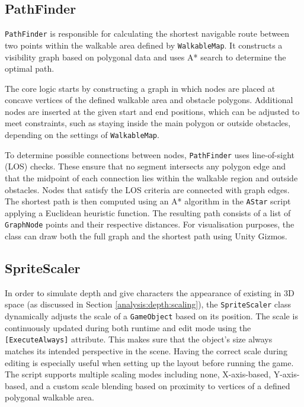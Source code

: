 \subsection{PathFinder}
\verb|PathFinder| is responsible for calculating the shortest navigable route between two points within the walkable area defined by \verb|WalkableMap|. It constructs a visibility graph based on polygonal data and uses A* search to determine the optimal path.

The core logic starts by constructing a graph in which nodes are placed at concave vertices of the defined walkable area and obstacle polygons. Additional nodes are inserted at the given start and end positions, which can be adjusted to meet constraints, such as staying inside the main polygon or outside obstacles, depending on the settings of \verb|WalkableMap|.

To determine possible connections between nodes, \verb|PathFinder| uses line-of-sight (LOS) checks. These ensure that no segment intersects any polygon edge and that the midpoint of each connection lies within the walkable region and outside obstacles. Nodes that satisfy the LOS criteria are connected with graph edges. The shortest path is then computed using an A* algorithm in the \verb|AStar| script applying a Euclidean heuristic function.  The resulting path consists of a list of \verb|GraphNode| points and their respective distances. For visualisation purposes, the class can draw both the full graph and the shortest path using Unity Gizmos.




\subsection{SpriteScaler}
In order to simulate depth and give characters the appearance of existing in 3D space (as discussed in Section \ref{analysis:depth:scaling}), the \verb|SpriteScaler| class dynamically adjusts the scale of a \verb|GameObject| based on its position.  The scale is continuously updated during both runtime and edit mode using the \verb|[ExecuteAlways]| attribute. This makes sure that the object's size always matches its intended perspective in the scene. Having the correct scale during editing is especially useful when setting up the layout before running the game. The script supports multiple scaling modes including none, X-axis-based, Y-axis-based, and a custom scale blending based on proximity to vertices of a defined polygonal walkable area.

